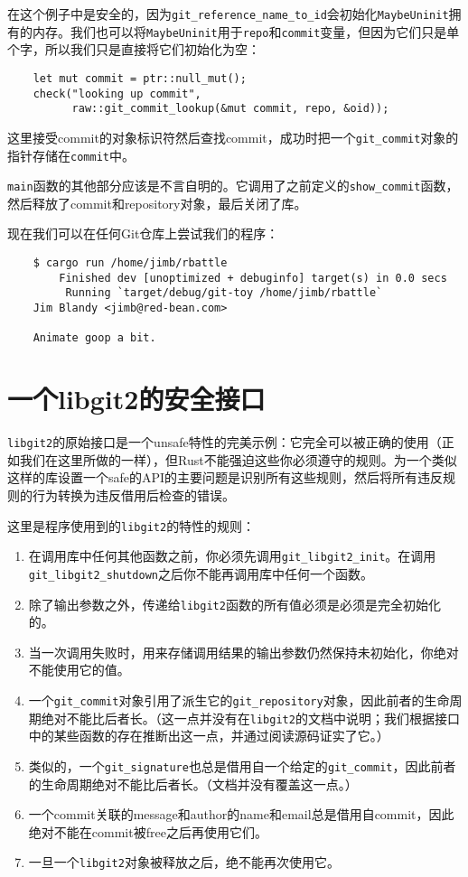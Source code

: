 在这个例子中是安全的，因为\texttt{git\_reference\_name\_to\_id}会初始化\texttt{MaybeUninit}拥有的内存。我们也可以将\texttt{MaybeUninit}用于\texttt{repo}和\texttt{commit}变量，但因为它们只是单个字，所以我们只是直接将它们初始化为空：
\begin{verbatim}
    let mut commit = ptr::null_mut();
    check("looking up commit",
          raw::git_commit_lookup(&mut commit, repo, &oid));
\end{verbatim}

这里接受commit的对象标识符然后查找commit，成功时把一个\texttt{git\_commit}对象的指针存储在\texttt{commit}中。

\texttt{main}函数的其他部分应该是不言自明的。它调用了之前定义的\texttt{show\_commit}函数，然后释放了commit和repository对象，最后关闭了库。

现在我们可以在任何Git仓库上尝试我们的程序：
\begin{verbatim}
    $ cargo run /home/jimb/rbattle
        Finished dev [unoptimized + debuginfo] target(s) in 0.0 secs
         Running `target/debug/git-toy /home/jimb/rbattle`
    Jim Blandy <jimb@red-bean.com>

    Animate goop a bit.
\end{verbatim}

\section{一个libgit2的安全接口}\label{SafeInter}
\texttt{libgit2}的原始接口是一个unsafe特性的完美示例：它完全可以被正确的使用（正如我们在这里所做的一样），但Rust不能强迫这些你必须遵守的规则。为一个类似这样的库设置一个safe的API的主要问题是识别所有这些规则，然后将所有违反规则的行为转换为违反借用后检查的错误。

这里是程序使用到的\texttt{libgit2}的特性的规则：
\begin{enumerate}
    \item 在调用库中任何其他函数之前，你必须先调用\texttt{git\_libgit2\_init}。在调用\texttt{git\_libgit2\_shutdown}之后你不能再调用库中任何一个函数。
    \item 除了输出参数之外，传递给\texttt{libgit2}函数的所有值必须是必须是完全初始化的。
    \item 当一次调用失败时，用来存储调用结果的输出参数仍然保持未初始化，你绝对不能使用它的值。
    \item 一个\texttt{git\_commit}对象引用了派生它的\texttt{git\_repository}对象，因此前者的生命周期绝对不能比后者长。（这一点并没有在\texttt{libgit2}的文档中说明；我们根据接口中的某些函数的存在推断出这一点，并通过阅读源码证实了它。）
    \item 类似的，一个\texttt{git\_signature}也总是借用自一个给定的\texttt{git\_commit}，因此前者的生命周期绝对不能比后者长。（文档并没有覆盖这一点。）
    \item 一个commit关联的message和author的name和email总是借用自commit，因此绝对不能在commit被free之后再使用它们。
    \item 一旦一个\texttt{libgit2}对象被释放之后，绝不能再次使用它。
\end{enumerate}

